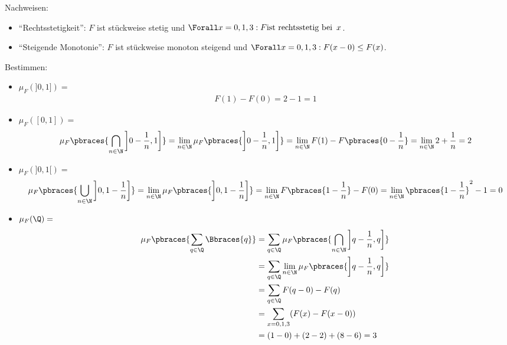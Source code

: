 \begin{solution}

Nachweisen:

\begin{itemize}

  \item \enquote{Rechtsstetigkeit}: $F$ ist stückweise stetig und $\Forall x = 0, 1, 3: F \text{ist rechtsstetig bei} \enspace x$.

  \item \enquote{Steigende Monotonie}: $F$ ist stückweise monoton steigend und $\Forall x = 0, 1, 3: F(x - 0) \leq F(x)$.

\end{itemize}

Bestimmen:

\begin{itemize}

  \item $\mu_F(]0, 1]) =$
  \begin{align*}
    F(1) - F(0) = 2 - 1 = 1
  \end{align*}

  \item $\mu_F([0, 1]) =$
  \begin{align*}
    \mu_F \pbraces{\bigcap_{n \in \N} \left ] 0 - \frac{1}{n}, 1 \right]}
    =
    \lim_{n \in \N} \mu_F \pbraces{ \left ] 0 - \frac{1}{n}, 1 \right]}
    =
    \lim_{n \in \N} F(1) - F \pbraces{0 - \frac{1}{n}}
    =
    \lim_{n \in \N} 2 + \frac{1}{n} = 2
  \end{align*}

  \item $\mu_F(]0, 1[) =$
  \begin{align*}
    \mu_F \pbraces{\bigcup_{n \in \N} \left ] 0, 1 - \frac{1}{n} \right ]}
    =
    \lim_{n \in \N} \mu_F \pbraces{\left ] 0, 1 - \frac{1}{n} \right ]}
    =
    \lim_{n \in \N} F \pbraces{1 - \frac{1}{n}} - F(0)
    =
    \lim_{n \in \N} \pbraces{1 - \frac{1}{n}}^2 - 1 = 0
  \end{align*}

  \item $\mu_F(\Q) =$
  \begin{align*}
    \mu_F \pbraces{\sum_{q \in \Q} \Bbraces{q}}
    & =
    \sum_{q \in \Q} \mu_F \pbraces
    {\bigcap_{n \in \N} \left ] q - \frac{1}{n}, q \right ]} \\
    & =
    \sum_{q \in \Q} \lim_{n \in \N} \mu_F \pbraces
    {\left ] q - \frac{1}{n}, q \right ]} \\
    & =
    \sum_{q \in \Q} F(q - 0) - F(q) \\
    & =
    \sum_{x = 0, 1, 3} (F(x) - F(x - 0)) \\
    & =
    (1 - 0) + (2 - 2) + (8 - 6) = 3
  \end{align*}

\end{itemize}

\end{solution}

